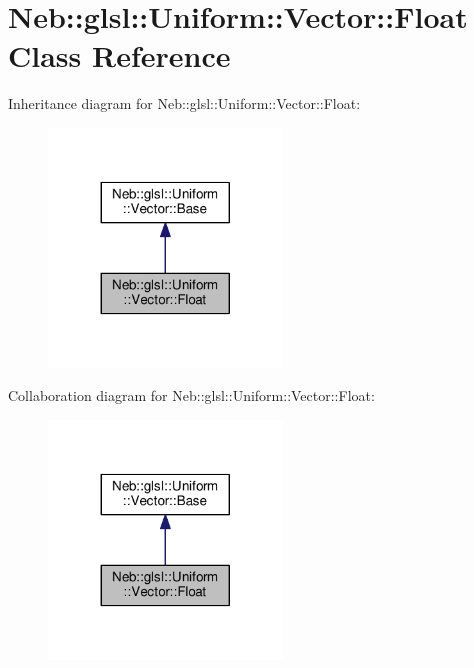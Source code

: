 \hypertarget{classNeb_1_1glsl_1_1Uniform_1_1Vector_1_1Float}{\section{Neb\-:\-:glsl\-:\-:Uniform\-:\-:Vector\-:\-:Float Class Reference}
\label{classNeb_1_1glsl_1_1Uniform_1_1Vector_1_1Float}
}


Inheritance diagram for Neb\-:\-:glsl\-:\-:Uniform\-:\-:Vector\-:\-:Float\-:
\nopagebreak
\begin{figure}[H]
\begin{center}
\leavevmode
\includegraphics[width=176pt]{classNeb_1_1glsl_1_1Uniform_1_1Vector_1_1Float__inherit__graph}
\end{center}
\end{figure}


Collaboration diagram for Neb\-:\-:glsl\-:\-:Uniform\-:\-:Vector\-:\-:Float\-:
\nopagebreak
\begin{figure}[H]
\begin{center}
\leavevmode
\includegraphics[width=176pt]{classNeb_1_1glsl_1_1Uniform_1_1Vector_1_1Float__coll__graph}
\end{center}
\end{figure}
